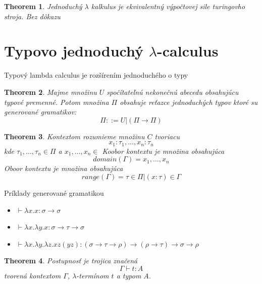 \documentclass[a4paper,10pt,oneside]{report}%
\newtheorem{theorem}{Theorem}
\begin{document}
\begin{theorem}
    Jednoduchý $\lambda$ kalkulus je ekvivalentný výpočtovej sile turingovho stroja.
    Bez dôkazu
\end{theorem}

\section{Typovo jednoduchý $\lambda$-calculus}

Typový lambda calculus je rozšírením jednoduchého o typy

\begin{theorem}
    Majme množinu $U$ spočítateľnú nekonečnú abecedu obsahujúcu typové premenné.
    Potom množina $\Pi$ obsahuje reťazce jednoduchých typov ktoré su generované
    gramatikov:
    \begin{equation}
        \Pi ::= U | (\Pi \to \Pi)
    \end{equation}
\end{theorem}

\begin{theorem}
    Kontextom rozumieme množinu $C$ tvoriacu 
    \begin{equation}
        { x_{1} : \tau_{1}, \dots, x_{n} : \tau_{n} }
    \end{equation}
    kde $\tau_{1}, \dots, \tau_{n} \in \Pi$ a $x_{1}, \dots , x_{n} \in$
    Koobor kontextu je množina obsahujúca
    \begin{equation}
        domain(\Gamma) = { x_{1}, \dots, x_{n} }
    \end{equation}
    Oboor kontextu je množina obsahujúca
    \begin{equation}
        range( \Gamma ) = { \tau \in \Pi  | (x : \tau ) \in \Gamma }
    \end{equation}
\end{theorem}

\noindent Príklady generované gramatikou
\begin{itemize}
    \item $\vdash \lambda x.x : \sigma \to \sigma$
    \item $\vdash \lambda x. \lambda y.x : \sigma \to \tau \to \sigma$
    \item $\vdash \lambda x. \lambda y. \lambda z.x z (y z): (\sigma \to \tau \to \rho) \to (\rho \to \tau) \to \sigma \to \rho$
\end{itemize}

\begin{theorem}
    Postupnosť je trojica značená
    \begin{equation}
        \Gamma \vdash t : A
    \end{equation}
tvorená kontextom $\Gamma$, $\lambda$-termínom $t$ a typom $A$.
\end{theorem}
\end{document}
